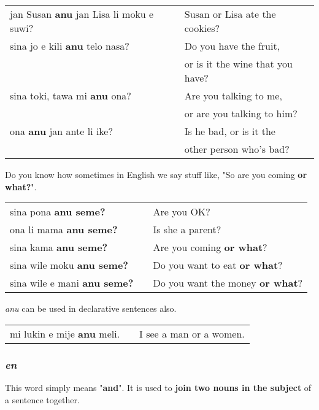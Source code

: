\begin{supertabular}{p{5,5cm}|ll}
jan Susan \textbf{anu} jan Lisa li moku e suwi?  && Susan or Lisa ate the cookies? \\
sina jo e kili \textbf{anu} telo nasa? && Do you have the fruit, \\ && or is it the wine that you have? \\
sina toki, tawa mi \textbf{anu} ona? && Are you talking to me, \\ && or are you talking to him? \\
ona \textbf{anu} jan ante li ike? && Is he bad, or is it the \\ && other person who's bad? \\
\end{supertabular} 

Do you know how sometimes in English we say stuff like, "So are you coming \textbf{or what?}". 

\begin{supertabular}{p{5,5cm}|ll}
sina pona \textbf{anu seme?} && Are you OK? \\
ona li mama \textbf{anu seme?} && Is she a parent? \\
sina kama \textbf{anu seme?} && Are you coming \textbf{or what}? \\ 
sina wile moku \textbf{anu seme?} && Do you want to eat \textbf{or what}? \\
sina wile e mani \textbf{anu seme?} && Do you want the money \textbf{or what}? \\
\end{supertabular} 

\textit{anu} can be used in declarative sentences also.

\begin{supertabular}{p{5,5cm}|ll}
mi lukin e mije \textbf{anu} meli.  &&  I see a man or a women. \\ 
\end{supertabular} 
%
\subsubsection*{\textit{en}}
%
This word simply means "\textbf{and}". 
It is used to \textbf{join two nouns in the subject} of a sentence together. 

